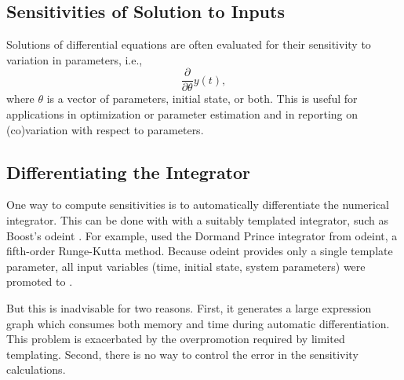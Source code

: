 \documentclass[10pt]{article}
\begin{document}



\subsection{Sensitivities of Solution to Inputs}

Solutions of differential equations are often evaluated for their
sensitivity to variation in parameters, i.e.,
\[
\frac{\partial}{\partial \theta} y(t),
\]
where $\theta$ is a vector of parameters, initial state, or both.
This is useful for applications in optimization or parameter
estimation and in reporting on (co)variation with respect to parameters.


\subsection{Differentiating the Integrator}

One way to compute sensitivities is to automatically differentiate the
numerical integrator.  This can be done with  with a
suitably templated integrator, such as Boost's odeint
\citep{AhnertMulansky:2014}. For example, \citep{WeberEtAl:2014} used
the Dormand Prince integrator from odeint, a fifth-order Runge-Kutta
method.  Because odeint provides only a single template parameter, all
input variables (time, initial state, system parameters) were promoted
to .

But this is inadvisable for two reasons.  First, it generates a large
expression graph which consumes both memory and time during automatic
differentiation.  This problem is exacerbated by the overpromotion
required by limited templating.  Second, there is no way to control
the error in the sensitivity calculations.
\end{document}
